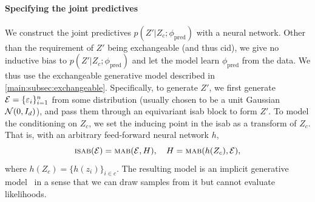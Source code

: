 \paragraph{Specifying the joint predictives}
We construct the joint predictives $p(Z'|Z_c;\phi_\text{pred})$ with a neural network. Other than the requirement of $Z'$ being exchangeable (and thus \gls{cid}), we give no inductive bias to $p(Z'|Z_c;\phi_\text{pred})$ and let the model learn $\phi_\text{pred}$ from the data. We thus use the exchangeable generative model described in \cref{main:subsec:exchangeable}. Specifically, to generate $Z'$, we first generate ${\mathcal{E}} = \{\varepsilon_i\}_{i=1}^n$ from some distribution (usually chosen to be a unit Gaussian ${\mathcal{N}}(0, I_d)$), and pass them through an equivariant \gls{isab} block to form $Z'$. To model the conditioning on $Z_c$, we set the inducing point in the \gls{isab} as a transform of $Z_c$. That is, with an arbitrary feed-forward neural network $h$,
\[
\textsc{isab}({\mathcal{E}}) = \textsc{mab}({\mathcal{E}}, H), \quad H = \textsc{mab}( h(Z_c), {\mathcal{E}} ),
\]
where $h(Z_c) = \{h(z_i)\}_{i\in c}$. 
The resulting model is an implicit generative model~\citep{mohamed2016learning} in a sense that we can draw samples from it but cannot evaluate likelihoods.

